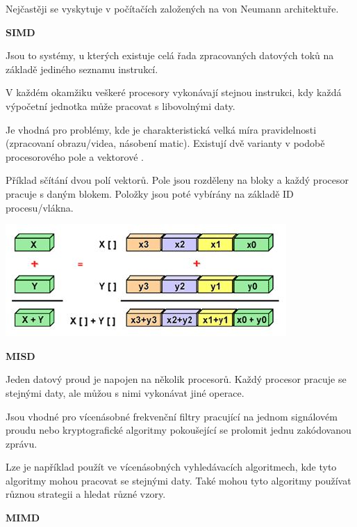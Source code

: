 Nejčastěji se vyskytuje v počítačích založených na von Neumann architektuře.


\begin{large}\vspace{0,5cm} \textbf{SIMD}
\end{large}

Jsou to systémy, u kterých existuje celá řada zpracovaných datových toků na základě jediného seznamu instrukcí.

V každém okamžiku veškeré procesory vykonávají stejnou instrukci, kdy každá výpočetní jednotka může pracovat s libovolnými daty.

Je vhodná pro problémy, kde je charakteristická velká míra pravidelnosti (zpracovaní obrazu/videa, násobení matic). Existují dvě varianty v podobě procesorového pole a vektorové . 


Příklad sčítání dvou polí vektorů. Pole jsou rozděleny na bloky a každý procesor pracuje s daným blokem. Položky jsou poté vybírány na základě ID procesu/vlákna.

\begin{center}
\includegraphics[scale=0.7]{images/SIMD.JPG}
\end{center}

\begin{large}\vspace{0,5cm} \textbf{MISD}
\end{large}

Jeden datový proud je napojen na několik procesorů. Každý procesor pracuje se stejnými daty, ale můžou s nimi vykonávat jiné operace.

Jsou vhodné pro vícenásobné frekvenční filtry pracující na jednom signálovém proudu nebo kryptografické algoritmy pokoušející se prolomit jednu zakódovanou zprávu.

Lze je například použít ve vícenásobných vyhledávacích algoritmech, kde tyto algoritmy mohou pracovat se stejnými daty. Také mohou tyto algoritmy používat různou strategii a hledat různé vzory.

\begin{large}\vspace{0,5cm} \textbf{MIMD}
\end{large}


